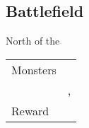 \subsection{Battlefield}
\label{map:battlefield_10}

North of the 

\noindent\begin{tabularx}{\textwidth}[l]{lX}
	Monsters
	& \nameref{monster:phanquid} \\
	& \nameref{monster:phanquid}, \nameref{monster:sphinx}
\\ \hline
	Reward & \nameref{spell:exit}
\end{tabularx}

